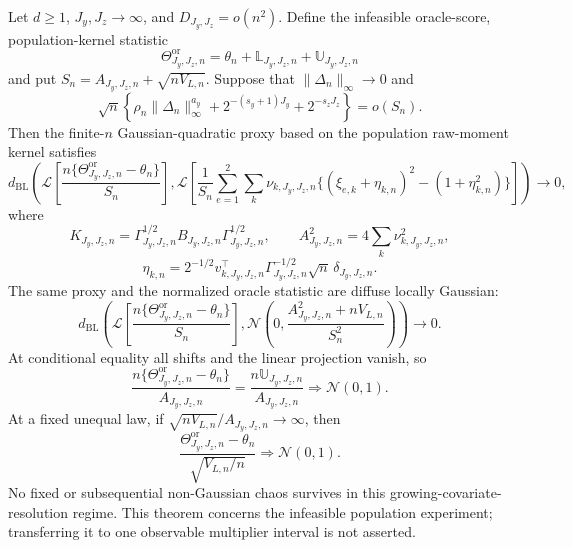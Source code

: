 Let \(d\ge1\), \(J_y,J_z\to\infty\), and \(D_{J_y,J_z}=o(n^2)\).  Define the infeasible oracle-score, population-kernel statistic
\[
\Theta^{\mathrm{or}}_{J_y,J_z,n}
=\theta_n+\mathbb L_{J_y,J_z,n}+\mathbb U_{J_y,J_z,n}
\]
and put \(S_n=A_{J_y,J_z,n}+\sqrt{nV_{L,n}}\).  Suppose that \(\|\Delta_n\|_\infty\to0\) and
\[
\sqrt n\left\{
\rho_n\|\Delta_n\|_\infty^{a_y}
+2^{-(s_y+1)J_y}+2^{-s_zJ_z}
\right\}=o(S_n).
\]
Then the finite-\(n\) Gaussian-quadratic proxy based on the population raw-moment kernel satisfies
\[
d_{\mathrm{BL}}\!\left(
\mathcal L\left[\frac{n\{\Theta^{\mathrm{or}}_{J_y,J_z,n}-\theta_n\}}{S_n}\right],
\mathcal L\left[\frac1{S_n}\sum_{e=1}^2\sum_k\nu_{k,J_y,J_z,n}
\{(\xi_{e,k}+\eta_{k,n})^2-(1+\eta_{k,n}^2)\}\right]
\right)\to0,
\]
where
\[
K_{J_y,J_z,n}=\Gamma_{J_y,J_z,n}^{1/2}B_{J_y,J_z,n}\Gamma_{J_y,J_z,n}^{1/2},
\qquad
A_{J_y,J_z,n}^2=4\sum_k\nu_{k,J_y,J_z,n}^2,
\]
\[
\eta_{k,n}=2^{-1/2}v_{k,J_y,J_z,n}^{\top}\Gamma_{J_y,J_z,n}^{-1/2}\sqrt n\,\delta_{J_y,J_z,n}.
\]
The same proxy and the normalized oracle statistic are diffuse locally Gaussian:
\[
d_{\mathrm{BL}}\!\left(
\mathcal L\left[\frac{n\{\Theta^{\mathrm{or}}_{J_y,J_z,n}-\theta_n\}}{S_n}\right],
\mathcal N\!\left(0,\frac{A_{J_y,J_z,n}^2+nV_{L,n}}{S_n^2}\right)
\right)\to0.
\]
At conditional equality all shifts and the linear projection vanish, so
\[
\frac{n\{\Theta^{\mathrm{or}}_{J_y,J_z,n}-\theta_n\}}{A_{J_y,J_z,n}}
=\frac{n\mathbb U_{J_y,J_z,n}}{A_{J_y,J_z,n}}
\Rightarrow\mathcal N(0,1).
\]
At a fixed unequal law, if \(\sqrt{nV_{L,n}}/A_{J_y,J_z,n}\to\infty\), then
\[
\frac{\Theta^{\mathrm{or}}_{J_y,J_z,n}-\theta_n}{\sqrt{V_{L,n}/n}}
\Rightarrow\mathcal N(0,1).
\]
No fixed or subsequential non-Gaussian chaos survives in this growing-covariate-resolution regime.  This theorem concerns the infeasible population experiment; transferring it to one observable multiplier interval is not asserted.